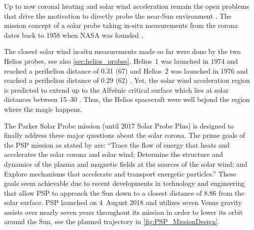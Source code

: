 Up to now coronal heating and solar wind acceleration remain the open problems that drive the motivation to directly probe the near-Sun environment \citep{McComas2007,Fox2015}. The mission concept of a solar probe taking in-situ measurements from the corona dates back to 1958 when NASA was founded \citep{McComas200807}.

The closest solar wind in-situ measurements made so far were done by the two Helios probes, see also \autoref{sec:helios_probes}. Helios~1 was launched in 1974 and reached a perihelion distance of \SI{0.31}{\au} (\SI{67}{\Rs}) and Helios~2 was launched in 1976 and reached a perihelion distance of \SI{0.29}{\au} (\SI{62}{\Rs}) \citep{Rosenbauer1977}. Yet, the solar wind acceleration region is predicted to extend up to the Alfvénic critical surface which lies at solar distances between \SIrange{15}{30}{\Rs} \citep{Katsikas2010,Goelzer2014}. Thus, the Helios spacecraft were well bejond the region where the magic happens.

The Parker Solar Probe mission (until 2017 Solar Probe Plus) is designed to finally address these major questions about the solar corona. The prime goals of the PSP mission as stated by \citet{Fox2015} are: ``Trace the flow of energy that heats and accelerates the solar corona and solar wind; Determine the structure and dynamics of the plasma and magnetic fields at the sources of the solar wind; and Explore mechanisms that accelerate and transport energetic particles.''
These goals seem achievable due to recent developments in technology and engineering that allow PSP to approach the Sun down to a closest distance of \SI{8.86}{\Rs} from the solar surface. PSP launched on 4~August 2018 and utilizes seven Venus gravity assists over nearly seven years throughout its mission in order to lower its orbit around the Sun, see the planned trajectory in \autoref{fig:PSP_MissionDesign}.
\begin{figure}
\end{figure}

